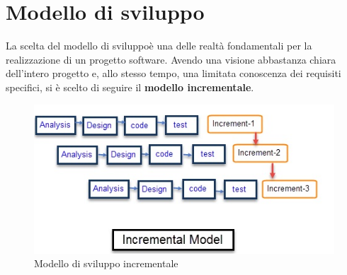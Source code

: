 \section{Modello di sviluppo}
La scelta del modello di sviluppo\glosp è una delle realtà fondamentali per la realizzazione di un progetto software.
Avendo una visione abbastanza chiara dell'intero progetto e, allo stesso tempo, una limitata conoscenza dei requisiti specifici, si è scelto di seguire il \textbf{modello incrementale}.

\begin{figure}[H]
	\includegraphics[width=0.99\linewidth]{res/images/incremental_model.jpg}
	\caption{Modello di sviluppo incrementale}
\end{figure}

